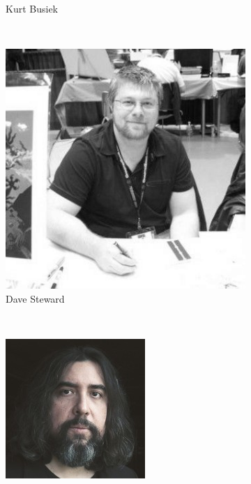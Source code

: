 \begin{frame}{}
\begin{figure}[htp]
\begin{subfigure}[b]{0.17\textwidth}
   \caption{Kurt Busiek}
 \end{subfigure}
\\
 \begin{subfigure}[b]{0.17\textwidth}
   \includegraphics[width=\textwidth]{img/artistas/DaveStewart}
   \caption{Dave Steward}
 \end{subfigure}
~
 \begin{subfigure}[b]{0.17\textwidth}
   \includegraphics[width=\textwidth]{img/artistas/JoseLadronn}

\end{subfigure}
\end{figure}
\end{frame}
